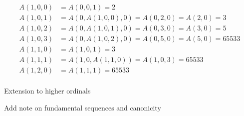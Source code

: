\documentclass{article}
\begin{document}
\begin{align*}
  A(1, 0, 0) &= A(0, 0, 1) = 2 \\
  A(1, 0, 1) &= A(0, A(1, 0, 0), 0) = A(0, 2, 0) = A(2, 0) = 3 \\
  A(1, 0, 2) &= A(0, A(1, 0, 1), 0) = A(0, 3, 0) = A(3, 0) = 5 \\
  A(1, 0, 3) &= A(0, A(1, 0, 2), 0) = A(0, 5, 0) = A(5, 0) = 65533 \\
  A(1, 1, 0) &= A(1, 0, 1) = 3 \\
  A(1, 1, 1) &= A(1, 0, A(1, 1, 0)) = A(1, 0, 3) = 65533 \\
  A(1, 2, 0) &= A(1, 1, 1) = 65533 \\
\end{align*}

Extension to higher ordinals

Add note on fundamental sequences and canonicity

\end{document}
